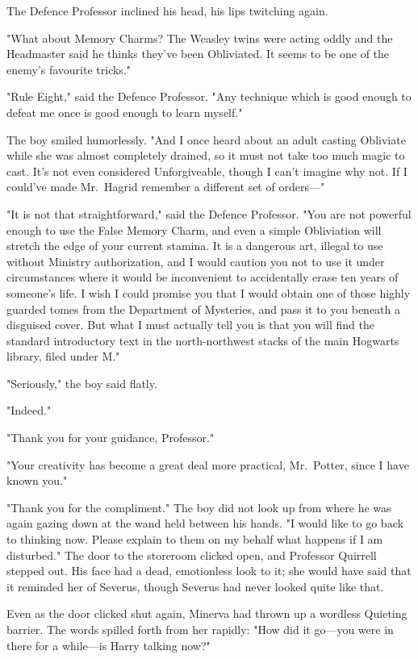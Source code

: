 The Defence Professor inclined his head, his lips twitching again.

"What about Memory Charms? The Weasley twins were acting oddly and the
Headmaster said he thinks they've been Obliviated. It seems to be one of the
enemy's favourite tricks."

"Rule Eight," said the Defence Professor. "Any technique which is good enough
to defeat me once is good enough to learn myself."

The boy smiled humorlessly. "And I once heard about an adult casting Obliviate
while she was almost completely drained, so it must not take too much magic to
cast. It's not even considered Unforgiveable, though I can't imagine why not.
If I could've made Mr.~Hagrid remember a different set of orders---"

"It is not that straightforward," said the Defence Professor. "You are not
powerful enough to use the False Memory Charm, and even a simple Obliviation
will stretch the edge of your current stamina. It is a dangerous art, illegal
to use without Ministry authorization, and I would caution you not to use it
under circumstances where it would be inconvenient to accidentally erase ten
years of someone's life. I wish I could promise you that I would obtain one of
those highly guarded tomes from the Department of Mysteries, and pass it to you
beneath a disguised cover. But what I must actually tell you is that you will
find the standard introductory text in the north-northwest stacks of the main
Hogwarts library, filed under M."

"Seriously," the boy said flatly.

"Indeed."

"Thank you for your guidance, Professor."

"Your creativity has become a great deal more practical, Mr.~Potter, since I
have known you."

"Thank you for the compliment." The boy did not look up from where he was again
gazing down at the wand held between his hands. "I would like to go back to
thinking now. Please explain to them on my behalf what happens if I am
disturbed."
\later
The door to the storeroom clicked open, and Professor Quirrell stepped out. His
face had a dead, emotionless look to it; she would have said that it reminded
her of Severus, though Severus had never looked quite like that.

Even as the door clicked shut again, Minerva had thrown up a wordless Quieting
barrier. The words spilled forth from her rapidly: "How did it go---you were in
there for a while---is Harry talking now?"

